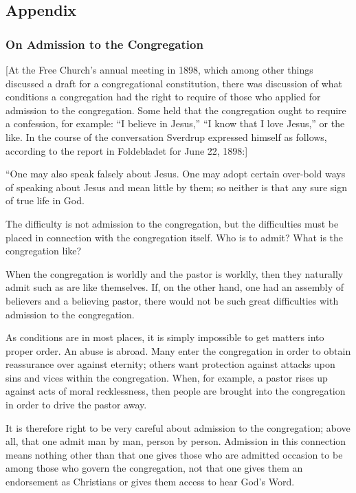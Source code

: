 
\subsection{Appendix}

\subsubsection{On Admission to the Congregation}

[At the Free Church’s annual meeting in 1898, which among other things discussed a draft for a congregational constitution, there was discussion of what conditions a congregation had the right to require of those who applied for admission to the congregation. Some held that the congregation ought to require a confession, for example: “I believe in Jesus,” “I know that I love Jesus,” or the like. In the course of the conversation Sverdrup expressed himself as follows, according to the report in Foldebladet for June 22, 1898:]

“One may also speak falsely about Jesus. One may adopt certain over-bold ways of speaking about Jesus and mean little by them; so neither is that any sure sign of true life in God.

The difficulty is not admission to the congregation, but the difficulties must be placed in connection with the congregation itself. Who is to admit? What is the congregation like?

When the congregation is worldly and the pastor is worldly, then they naturally admit such as are like themselves. If, on the other hand, one had an assembly of believers and a believing pastor, there would not be such great difficulties with admission to the congregation.

As conditions are in most places, it is simply impossible to get matters into proper order. An abuse is abroad. Many enter the congregation in order to obtain reassurance over against eternity; others want protection against attacks upon sins and vices within the congregation. When, for example, a pastor rises up against acts of moral recklessness, then people are brought into the congregation in order to drive the pastor away.

It is therefore right to be very careful about admission to the congregation; above all, that one admit man by man, person by person. Admission in this connection means nothing other than that one gives those who are admitted occasion to be among those who govern the congregation, not that one gives them an endorsement as Christians or gives them access to hear God’s Word.

